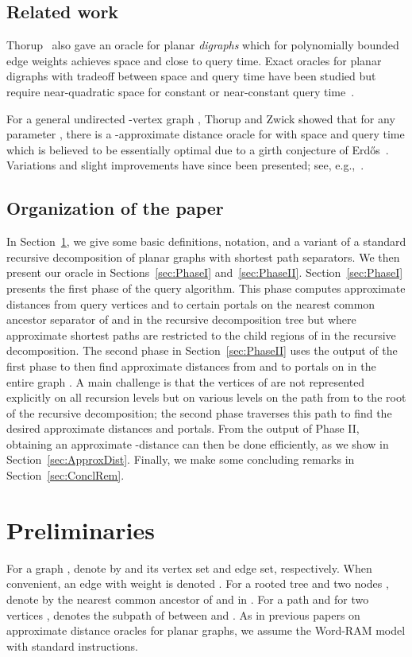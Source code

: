 \documentclass[11pt]{article}
\begin{document}
\subsection{Related work}
Thorup~\cite{OraclePlanarThorup} also gave an oracle for planar \emph{digraphs} which for polynomially bounded edge weights achieves  space and close to  query time. Exact oracles for planar digraphs with tradeoff between space and query time have been studied but require near-quadratic space for constant or near-constant query time~\cite{ExactOraclePlanarMozesSommer,CWNPHD}.

For a general undirected -vertex graph , Thorup and Zwick showed that for any parameter , there is a -approximate distance oracle for  with  space and  query time which is believed to be essentially optimal due to a girth conjecture of Erd\H{o}s~\cite{Erdos}. Variations and slight improvements have since been presented; see, e.g.,~\cite{ChechikOracleGeneral,MendelNaor,PatrascuRoditty,CWNOracleGeneral1,CWNOracleGeneral2}.

\subsection{Organization of the paper}
In Section~\ref{sec:Prelim}, we give some basic definitions, notation, and a variant of a standard recursive decomposition of planar graphs with shortest path separators. We then present our oracle in Sections~\ref{sec:PhaseI} and~\ref{sec:PhaseII}. Section~\ref{sec:PhaseI} presents the first phase of the query algorithm. This phase computes approximate distances from query vertices  and  to certain portals on the nearest common ancestor separator  of  and  in the recursive decomposition tree but where approximate shortest paths are restricted to the child regions of  in the recursive decomposition. The second phase in Section~\ref{sec:PhaseII} uses the output of the first phase to then find approximate distances from  and  to portals on  in the entire graph . A main challenge is that the vertices of  are not represented explicitly on all recursion levels but on various levels on the path from  to the root of the recursive decomposition; the second phase traverses this path to find the desired approximate distances and portals. From the output of Phase II, obtaining an approximate -distance can then be done efficiently, as we show in Section~\ref{sec:ApproxDist}. Finally, we make some concluding remarks in Section~\ref{sec:ConclRem}.

\section{Preliminaries}\label{sec:Prelim}
For a graph , denote by  and  its vertex set and edge set, respectively. When convenient, an edge  with weight  is denoted . For a rooted tree  and two nodes , denote by  the nearest common ancestor of  and  in . For a path  and for two vertices ,  denotes the subpath of  between  and . As in previous papers on approximate distance oracles for planar graphs, we assume the Word-RAM model with standard instructions.
\end{document}
